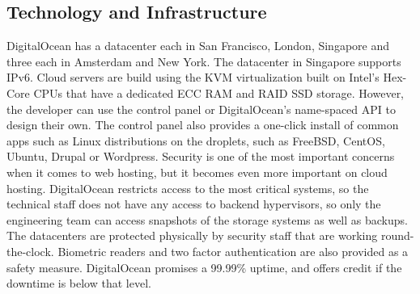 \documentclass[../thesis.tex]{subfiles}
\begin{document}
\subsection*{Technology and Infrastructure}
DigitalOcean has a datacenter each in San Francisco, London, Singapore and three each in Amsterdam and New York. The datacenter in Singapore supports IPv6. Cloud servers are build using the KVM virtualization built on Intel's Hex-Core CPUs that have a dedicated ECC RAM and RAID SSD storage. However, the developer can use the control panel or DigitalOcean's name-spaced API to design their own. The control panel also provides a one-click install of common apps such as Linux distributions on the droplets, such as FreeBSD, CentOS, Ubuntu, Drupal or Wordpress.
Security is one of the most important concerns when it comes to web hosting, but it becomes even more important on cloud hosting. DigitalOcean restricts access to the most critical systems, so the technical staff does not have any access to backend hypervisors, so only the engineering team can access snapshots of the storage systems as well as backups. The datacenters are protected physically by security staff that are working round-the-clock. Biometric readers and two factor authentication are also provided as a safety measure. DigitalOcean promises a 99.99\% uptime, and offers credit if the downtime is below that level.
\end{document}
